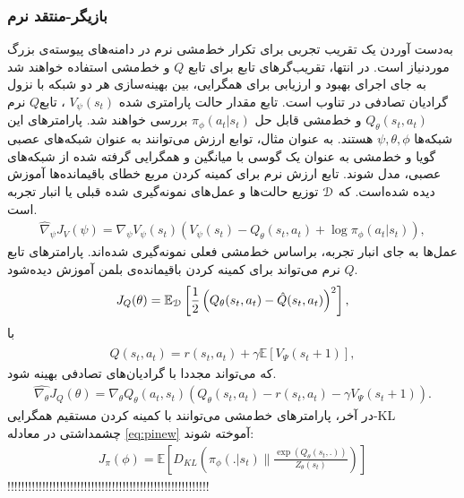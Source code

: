 \subsubsection{بازیگر-منتقد نرم}
به‌دست آوردن یک تقریب تجربی برای تکرار خط‌مشی نرم در دامنه‌های پیوسته‌ی بزرگ موردنیاز است.  در انتها، تقریب‌گرهای تابع برای تابع
$ Q$
 و خط‌مشی استفاده خواهند شد به جای اجرای بهبود و ارزیابی برای همگرایی، بین بهینه‌سازی هر دو شبکه با نزول گرادیان تصادفی در تناوب است. تابع مقدار حالت پارامتری شده
 $V_\psi (s_t)$
 ، تابع$Q$ نرم 
 $Q_\theta (s_t,a_t)$
  و خط‌مشی قابل حل 
  $\pi_\phi (a_t | s_t)$
  بررسی خواهند شد. پارامترهای این شبکه‌ها 
  $\psi, \theta, \phi$
   هستند. به عنوان مثال، توابع ارزش می‌توانند به عنوان شبکه‌های عصبی گویا و خط‌مشی به عنوان یک گوسی با میانگین و همگرایی گرفته شده از شبکه‌های عصبی، مدل شوند.
تابع ارزش نرم برای کمینه کردن مربع خطای باقیمانده‌ها آموزش دیده شده‌است.
که 
$\EuScript{D}$
 توزیع حالت‌ها و عمل‌های نمونه‌گیری شده قبلی یا انبار تجربه
  است.
\begin{align}
\hat{\nabla}_\psi J_V (\psi) = \nabla_\psi V_\psi (s_t) (V_\psi (s_t)-Q_\theta(s_t,a_t)+\log \pi_\phi (a_t |s_t)) ,
\end{align}
عمل‌ها به جای انبار تجربه، براساس خط‌مشی فعلی نمونه‌گیری شده‌اند. پارامترهای تابع $Q$ نرم می‌تواند برای کمینه کردن باقیمانده‌ی بلمن آموزش دیده‌شود.
\begin{align}
J_Q(\theta) = \mathbb{E}_{\EuScript{D}} \left[ \frac{1}{2} \left( Q_\theta (s_t,a_t)- \hat{Q} (s_t,a_t)\right)^2 \right] ,
\end{align}
با 
\begin{align*}
\hat{Q} (s_t,a_t) = r(s_t,a_t) + \gamma \mathbb{E} [V_\Psi (s_t+1)] ,
\end{align*}
که می‌تواند مجددا با گرادیان‌های تصادفی بهینه شود.
\begin{align}
\hat{\nabla_{\theta}} J_Q (\theta) = \nabla_\theta Q_\theta (a_t,s_t) \left( Q_\theta (s_t,a_t)- r(s_t,a_t) - \gamma V_\Psi (s_t+1) \right). 
\label{eq:hatnabla}
\end{align}
در آخر، پارامترهای خط‌مشی می‌توانند با کمینه کردن مستقیم همگرایی-KL چشمداشتی در معادله \ref{eq:pinew} آموخته شوند:
\begin{align}
J_\pi(\phi) = \mathbb{E}\left[ D_{KL}  \left( \pi_\phi(.|s_t) \parallel \frac{\exp{(Q_{\theta} (s_t,.))}}{Z_{\theta} (s_t)}\right) \right]
\end{align}
!!!!!!!!!!!!!!!!!!!!!!!!!!!!!!!!!!!!!!!!!!!!!!!!!!!!!!!!!!
